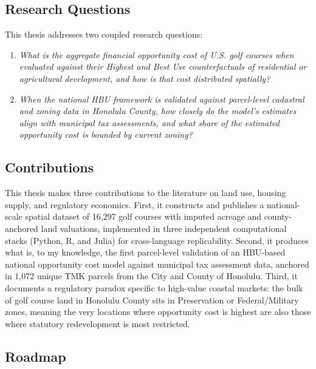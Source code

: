\documentclass[11pt, letterpaper]{article}
\begin{document}
\subsection{Research Questions}

This thesis addresses two coupled research questions:

\begin{enumerate}[leftmargin=*]
    \item \textit{What is the aggregate financial opportunity cost of U.S. golf courses when evaluated against their Highest and Best Use counterfactuals of residential or agricultural development, and how is that cost distributed spatially?}
    \item \textit{When the national HBU framework is validated against parcel-level cadastral and zoning data in Honolulu County, how closely do the model's estimates align with municipal tax assessments, and what share of the estimated opportunity cost is bounded by current zoning?}
\end{enumerate}

\subsection{Contributions}

This thesis makes three contributions to the literature on land use, housing supply, and regulatory economics. First, it constructs and publishes a national-scale spatial dataset of 16,297 golf courses with imputed acreage and county-anchored land valuations, implemented in three independent computational stacks (Python, R, and Julia) for cross-language replicability. Second, it produces what is, to my knowledge, the first parcel-level validation of an HBU-based national opportunity cost model against municipal tax assessment data, anchored in 1,072 unique TMK parcels from the City and County of Honolulu. Third, it documents a regulatory paradox specific to high-value coastal markets: the bulk of golf course land in Honolulu County sits in Preservation or Federal/Military zones, meaning the very locations where opportunity cost is highest are also those where statutory redevelopment is most restricted.

\subsection{Roadmap}
\end{document}
